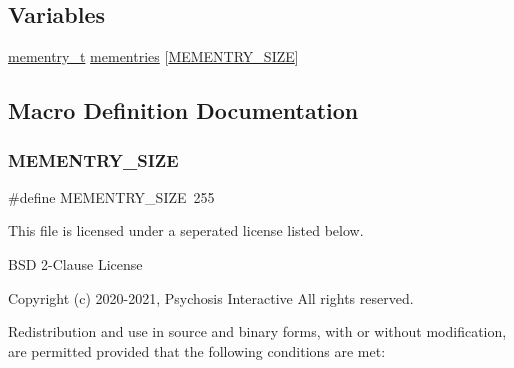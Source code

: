 \subsection*{Variables}
\begin{DoxyCompactItemize}
\item 
\hyperlink{a00119_a876b6ee19692762a87e4673911f9b8da_a876b6ee19692762a87e4673911f9b8da}{mementry\+\_\+t} \hyperlink{a00116_a9ec3d7a60bca9bd965aba15905c6d1ed_a9ec3d7a60bca9bd965aba15905c6d1ed}{mementries} \mbox{[}\hyperlink{a00116_a48623ea6ed429e2f046b49041dde1dc5_a48623ea6ed429e2f046b49041dde1dc5}{M\+E\+M\+E\+N\+T\+R\+Y\+\_\+\+S\+I\+ZE}\mbox{]}
\end{DoxyCompactItemize}


\subsection{Macro Definition Documentation}
\mbox{\label{a00116_a48623ea6ed429e2f046b49041dde1dc5_a48623ea6ed429e2f046b49041dde1dc5}} 
\subsubsection{\texorpdfstring{M\+E\+M\+E\+N\+T\+R\+Y\+\_\+\+S\+I\+ZE}{MEMENTRY\_SIZE}}
{\footnotesize\ttfamily \#define M\+E\+M\+E\+N\+T\+R\+Y\+\_\+\+S\+I\+ZE~255}



This file is licensed under a seperated license listed below. 

B\+SD 2-\/\+Clause License

Copyright (c) 2020-\/2021, Psychosis Interactive All rights reserved.

Redistribution and use in source and binary forms, with or without modification, are permitted provided that the following conditions are met\+:

